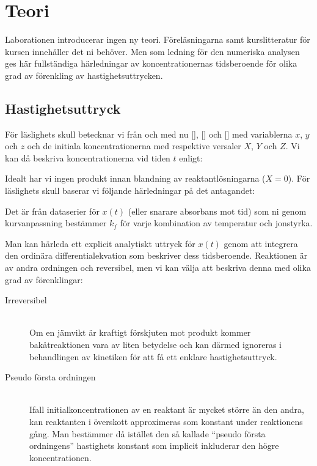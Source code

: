 \section{Teori}
\label{sec:teori}
Laborationen introducerar ingen ny teori. Föreläsningarna samt
kurslitteratur för kursen innehåller det ni behöver. Men som ledning för
den numeriska analysen ges här fullständiga härledningar av
koncentrationernas tidsberoende för olika grad av förenkling av
hastighetsuttrycken.

\subsection{Hastighetsuttryck}
För läslighets skull betecknar vi från och med nu [],
[] och [] med variablerna $x$, $y$ och $z$ och de
initiala koncentrationerna med respektive versaler $X$, $Y$ och $Z$. Vi
kan då beskriva koncentrationerna vid tiden $t$ enligt:



Idealt har vi ingen produkt innan blandning av reaktantlösningarna
($X=0$). För läslighets skull baserar vi följande härledningar på det
antagandet:



Det är från dataserier för $x(t)$ (eller snarare absorbans mot tid) som
ni genom kurvanpassning bestämmer $k_f$ för varje kombination av
temperatur och jonstyrka.

Man kan härleda ett explicit analytiskt uttryck för $x(t)$ genom att
integrera den ordinära differentialekvation som beskriver dess
tidsberoende. Reaktionen är av andra ordningen och reversibel, men vi kan
välja att beskriva denna med olika grad av förenklingar:
\begin{description}
\item[Irreversibel] \hfill \\
  Om en jämvikt är kraftigt förskjuten mot produkt kommer
  bakåtreaktionen vara av liten betydelse och kan därmed
  ignoreras i behandlingen av kinetiken för att få
  ett enklare hastighetsuttryck.
\item[Pseudo första ordningen] \hfill \\ %
  Ifall initialkoncentrationen av en reaktant är mycket större än den andra,
  kan reaktanten i överskott approximeras som konstant under reaktionens
  gång. Man bestämmer då istället den så kallade ``pseudo första ordningens''
  hastighets konstant som implicit inkluderar den högre koncentrationen.
\end{description}

